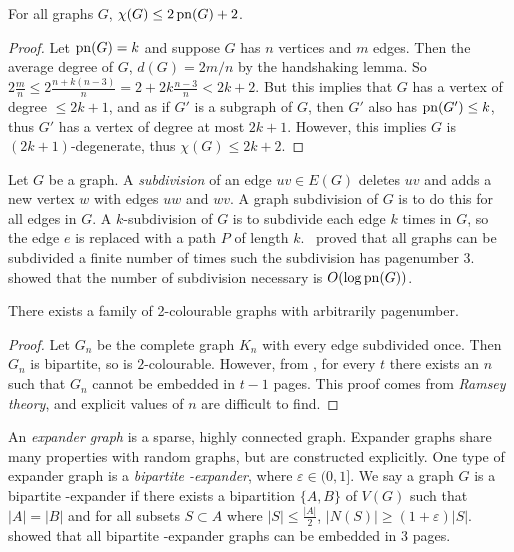 \begin{theorem}\label{thm:Colouring_Bound}
	For all graphs \(G\), \(\chi(G) \leq 2 \operatorname{pn}(G) + 2\).
\end{theorem}
\begin{proof}
	Let \(\operatorname{pn}(G) = k\) and suppose \(G\) has \(n\) vertices and \(m\) edges. Then the average degree of \(G\), \(d(G) = 2m/n\) by the handshaking lemma. So \(2\frac{m}{n} \leq 2 \frac{n + k(n-3)}{n} = 2 + 2k \frac{n-3}{n} < 2k + 2\). But this implies that \(G\) has a vertex of degree \(\leq 2k + 1\), and as if \(G'\) is a subgraph of \(G\), then \(G'\) also has \(\operatorname{pn}(G') \leq k\), thus \(G'\) has a vertex of degree at most \(2k + 1\). However, this implies \(G\) is \((2k + 1)\)-degenerate, thus \(\chi(G) \leq 2k + 2\).
\end{proof}

Let $G$ be a graph. A \textit{subdivision} of an edge $uv \in E(G)$ deletes $uv$ and adds a new vertex $w$ with edges $uw$ and $wv$. A graph subdivision of $G$ is to do this for all edges in $G$. A $k$-subdivision of $G$ is to subdivide each edge $k$ times in $G$, so the edge $e$ is replaced with a path $P$ of length $k$.\ \textcite{atneosenEmbeddabilityCompactaNbooks} proved that all graphs can be subdivided a finite number of times such the subdivision has pagenumber 3.\ \textcite{dujmovicLayoutsGraphSubdivisions2005} showed that the number of subdivision necessary is $O(\log\operatorname{pn}(G))$.

\begin{theorem}
	There exists a family of 2-colourable graphs with arbitrarily pagenumber.
\end{theorem}
\begin{proof}
	Let $G_n$ be the complete graph $K_n$ with every edge subdivided once. Then $G_n$ is bipartite, so is $2$-colourable. However, from \textcite{eppsteinSeparatingThicknessGeometric2002}, for every $t$ there exists an $n$ such that $G_n$ cannot be embedded in $t-1$ pages. This proof comes from \textit{Ramsey theory}, and explicit values of $n$ are difficult to find. 
\end{proof}

An \textit{expander graph} is a sparse, highly connected graph. Expander graphs share many properties with random graphs, but are constructed explicitly. One type of expander graph is a \textit{bipartite \varepsilon-expander}, where $\varepsilon \in (0, 1]$. We say a graph $G$ is a bipartite \varepsilon-expander if there exists a bipartition $ \{A, B\}$ of $V(G)$ such that $|A| = |B|$ and for all subsets $S \subset A$ where $|S| \leq \frac{|A|}{2}$, $|N(S)| \geq (1 + \varepsilon) |S|$. 
\textcite{dujmovicLayoutsExpanderGraphs2016} showed that all bipartite \varepsilon-expander graphs can be embedded in 3 pages. 


